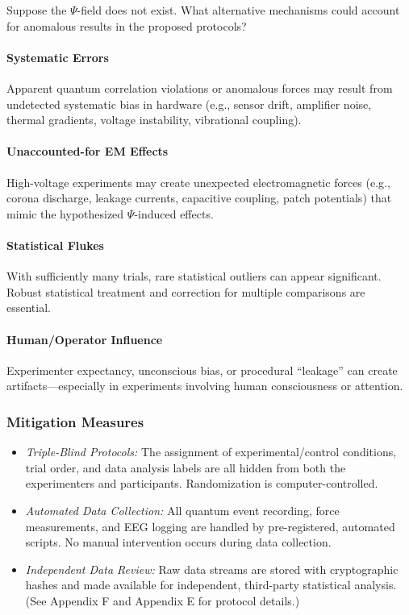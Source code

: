\documentclass{report}
\begin{document}
Suppose the $\Psi$-field does not exist. What alternative mechanisms could account for anomalous
results in the proposed protocols?

\paragraph{Systematic Errors}
Apparent quantum correlation violations or anomalous forces may result from undetected systematic bias in hardware (e.g., sensor drift, amplifier noise, thermal
gradients, voltage instability, vibrational coupling).

\paragraph{Unaccounted-for EM Effects}
High-voltage experiments may create unexpected electromagnetic forces (e.g., corona discharge, leakage currents, capacitive coupling, patch potentials) that
mimic the hypothesized $\Psi$-induced effects.

\paragraph{Statistical Flukes}
With sufficiently many trials, rare statistical outliers can appear significant. Robust statistical treatment and correction for multiple comparisons are essential.

\paragraph{Human/Operator Influence}
Experimenter expectancy, unconscious bias, or procedural “leakage” can create artifacts—especially in experiments involving human consciousness or attention.

\subsubsection*{Mitigation Measures}
\begin{itemize}
    \item \textit{Triple-Blind Protocols:} The assignment of experimental/control conditions, trial order,
    and data analysis labels are all hidden from both the experimenters and participants.
    Randomization is computer-controlled.
    \item \textit{Automated Data Collection:} All quantum event recording, force measurements, and EEG
    logging are handled by pre-registered, automated scripts. No manual intervention occurs
    during data collection.
    \item \textit{Independent Data Review:} Raw data streams are stored with cryptographic hashes and
    made available for independent, third-party statistical analysis. (See Appendix F and
    Appendix E for protocol details.) %
\end{itemize}
\end{document}
